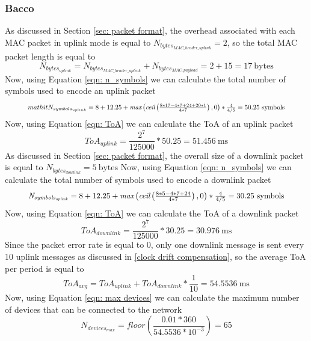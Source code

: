 \subsubsection{Bacco}
As discussed in Section \ref{sec: packet format}, the overhead associated with each \gls{MAC} packet in uplink mode is
equal to $\mathit{N_{bytes_{MAC\_header\_uplink}}} = 2$, so the total \gls{MAC} packet length is equal to
$$\mathit{N_{bytes_{uplink}}} = \mathit{N_{bytes_{MAC\_header\_uplink}}} + \mathit{N_{bytes_{MAC\_payload}}} = 2 + 15 =
17\ \mathrm{bytes}$$
Now, using Equation \ref{eqn: n_symbols} we can calculate the total number of symbols used to encode an uplink packet
\begin{equation*}
    \resizebox{.9\hsize}{!}{
        \ensuremath{mathit{N_{symbols_{uplink}}} = 8 + 12.25 + \textit{max} \left ( \textit{ceil} \left ( \frac{8 * 17 - 4 * 7 + 24 +
        20 * 1}{4 * 7} \right ), 0 \right ) * \frac{4}{4/5} = 50.25\ \mathrm{symbols}}
    }
\end{equation*}
Now, using Equation \ref{eqn: ToA} we can calculate the \gls{ToA} of an uplink packet
$$\mathit{ToA_{uplink}} = \frac{2^7}{125000} * 50.25 = 51.456\ \mathrm{ms}$$
As discussed in Section \ref{sec: packet format}, the overall size of a downlink packet is equal to
$\mathit{N_{bytes_{dowlink}}} = 5\ \mathrm{bytes}$
Now, using Equation \ref{eqn: n_symbols} we can calculate the total number of symbols used to encode a downlink packet
\begin{equation*}
    \resizebox{.9\hsize}{!}{
        \ensuremath{
        \mathit{N_{symbols_{uplink}}} = 8 + 12.25 + \textit{max} \left ( \textit{ceil} \left ( \frac{8 * 5 - 4 * 7 +
    24}{4 * 7} \right ), 0 \right ) * \frac{4}{4/5} = 30.25\ \mathrm{symbols}}
    }
\end{equation*}
Now, using Equation \ref{eqn: ToA} we can calculate the \gls{ToA} of a downlink packet
$$\mathit{ToA_{downlink}} = \frac{2^7}{125000} * 30.25 = 30.976\ \mathrm{ms}$$
Since the packet error rate is equal to 0, only one downlink message is sent every 10 uplink messages as discussed in
\ref{clock drift compensation}, so the average \gls{ToA} per period is equal to
$$\mathit{ToA_{avg}} = \mathit{ToA_{uplink}} + \mathit{ToA_{downlink}} * \frac{1}{10} = 54.5536\ \mathrm{ms}$$
Now, using Equation \ref{eqn: max devices} we can calculate the maximum number of devices that can be connected to the
network
$$\mathit{N_{devices_{max}}} = \textit{floor} \left( \frac{0.01 * 360}{54.5536 * 10^{-3}} \right) = 65$$

